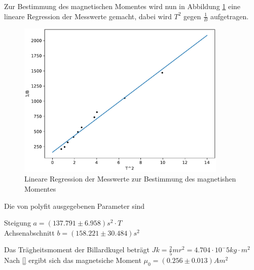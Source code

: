 Zur Bestimmung des magnetischen Momentes wird nun in Abbildung \ref{fig:plot2} eine lineare Regression der Messwerte gemacht, dabei wird $T^2$ gegen $\frac{1}{B}$ aufgetragen.
\begin{figure}
  \centering
  \includegraphics[width = 10cm]{plot2.pdf}
  \caption{Lineare Regression der Messwerte zur Bestimmung des magnetishen Momentes}
  \label{fig:plot2}
\end{figure}
Die von polyfit \cite{numpy} ausgegebenen Parameter sind\\

\begin{centering}
Steigung $a = (137.791 ± 6.958) s^2 \cdot T$\\
Achsenabschnitt $b = (158.221 ± 30.484) s^2$\\
\end{centering}

Das Trägheitsmoment der Billardkugel beträgt $Jk = \frac{2}{5}mr^2 = 4.704 \cdot 10^-5 kg\cdot m^2$\\

Nach \ref{} ergibt sich das magnetsiche Moment $\mu_0 = (0.256 \pm 0.013) Am^2$
\newpage


